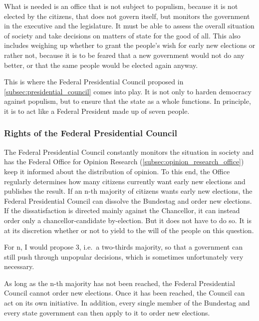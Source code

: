 What is needed is an office that is not subject to populism, because it is not elected by the citizens, that does not govern itself, but monitors the government in the executive and the legislature.
It must be able to assess the overall situation of society and take decisions on matters of state for the good of all.
This also includes weighing up whether to grant the people's wish for early new elections or rather not, because it is to be feared
that a new government would not do any better, or that the same people would be elected again anyway.

This is where the Federal Presidential Council proposed in \cref{subsec:presidential_council} comes into play.
It is not only to harden democracy against populism, but to ensure that the state as a whole functions.
In principle, it is to act like a Federal President made up of seven people.

\subsubsection{Rights of the Federal Presidential Council} \label{subsubsec:council_rights}

\label{subsubsubsec:early_elections_by_popular_demand}

The Federal Presidential Council constantly monitors the situation in society and has the Federal Office for Opinion Research (\cref{subsec:opinion_research_office}) keep it informed about the distribution of opinion.
To this end, the Office regularly determines how many citizens currently want early new elections and publishes the result.
If an n-th majority of citizens wants early new elections, the Federal Presidential Council can dissolve the Bundestag and order new elections.
If the dissatisfaction is directed mainly against the Chancellor, it can instead order only a chancellor-candidate by-election.
But it does not have to do so.
It is at its discretion whether or not to yield to the will of the people on this question.

For n, I would propose 3, i.e.\ a two-thirds majority, so that a government can still push through unpopular decisions, which is sometimes unfortunately very necessary.

As long as the n-th majority has not been reached, the Federal Presidential Council cannot order new elections.
Once it has been reached, the Council can act on its own initiative.
In addition, every single member of the Bundestag and every state government can then apply to it to order new elections.

